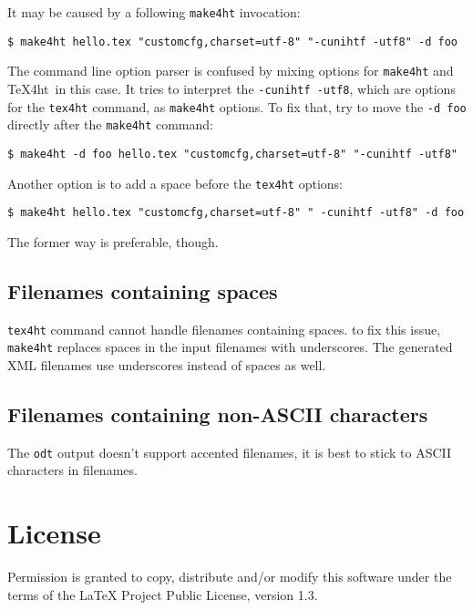 It may be caused by a following \texttt{make4ht} invocation:

\begin{verbatim}
$ make4ht hello.tex "customcfg,charset=utf-8" "-cunihtf -utf8" -d foo
\end{verbatim}

The command line option parser is confused by mixing options for
\texttt{make4ht} and \TeX4ht~in this case. It tries to interpret the
\texttt{-cunihtf\ -utf8}, which are options for the \texttt{tex4ht}
command, as \texttt{make4ht} options. To fix that, try to move the
\texttt{-d\ foo} directly after the \texttt{make4ht} command:

\begin{verbatim}
$ make4ht -d foo hello.tex "customcfg,charset=utf-8" "-cunihtf -utf8"
\end{verbatim}

Another option is to add a space before the \texttt{tex4ht} options:

\begin{verbatim}
$ make4ht hello.tex "customcfg,charset=utf-8" " -cunihtf -utf8" -d foo
\end{verbatim}

The former way is preferable, though.

\hypertarget{filenames-containing-spaces}{%
\subsection{Filenames containing
spaces}\label{filenames-containing-spaces}}

\texttt{tex4ht} command cannot handle filenames containing spaces. to
fix this issue, \texttt{make4ht} replaces spaces in the input filenames
with underscores. The generated XML filenames use underscores instead of
spaces as well.

\hypertarget{filenames-containing-non-ascii-characters}{%
\subsection{Filenames containing non-ASCII
characters}\label{filenames-containing-non-ascii-characters}}

The \texttt{odt} output doesn't support accented filenames, it is best
to stick to ASCII characters in filenames.

\hypertarget{license}{%
\section{License}\label{license}}

Permission is granted to copy, distribute and/or modify this software
under the terms of the LaTeX Project Public License, version 1.3.

